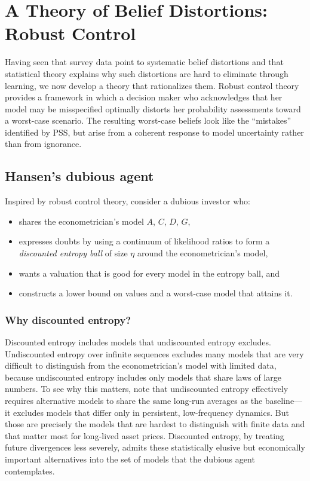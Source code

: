 \documentclass[12pt]{article}
\theoremstyle{definition}
\begin{document}
\section{A Theory of Belief Distortions: Robust Control}
\label{sec:robust}

Having seen that survey data point to systematic belief distortions and
that statistical theory explains why such distortions are hard to
eliminate through learning, we now develop a theory that rationalizes
them.  Robust control theory provides a framework in which a decision
maker who acknowledges that her model may be misspecified optimally
distorts her probability assessments toward a worst-case scenario.  The
resulting worst-case beliefs look like the ``mistakes'' identified by
PSS, but arise from a coherent response to model uncertainty rather than
from ignorance.

\subsection{Hansen's dubious agent}

Inspired by robust control theory, consider a dubious investor who:
\begin{itemize}
\item shares the econometrician's model $A$, $C$, $D$, $G$,
\item expresses doubts by using a continuum of likelihood ratios to form
      a \emph{discounted entropy ball} of size $\eta$ around the
      econometrician's model,
\item wants a valuation that is good for every model in the entropy
      ball, and
\item constructs a lower bound on values and a worst-case model that
      attains it.
\end{itemize}

\subsubsection{Why discounted entropy?}

Discounted entropy includes models that undiscounted entropy excludes.
Undiscounted entropy over infinite sequences excludes many models that
are very difficult to distinguish from the econometrician's model with
limited data, because undiscounted entropy includes only models that
share laws of large numbers.
To see why this matters, note that undiscounted entropy effectively
requires alternative models to share the same long-run averages as the
baseline---it excludes models that differ only in persistent,
low-frequency dynamics.
But those are precisely the models that are hardest to distinguish with
finite data and that matter most for long-lived asset prices.
Discounted entropy, by treating future divergences less severely, admits
these statistically elusive but economically important alternatives into
the set of models that the dubious agent contemplates.
\end{document}
